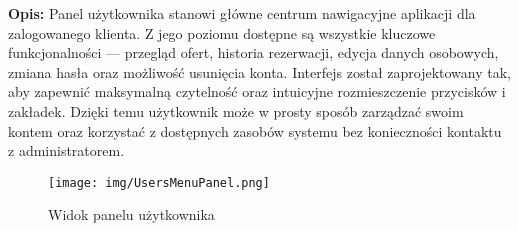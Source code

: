 \noindent
{\small \textbf{Opis:} Panel użytkownika stanowi główne centrum nawigacyjne aplikacji dla zalogowanego klienta. Z jego poziomu dostępne są wszystkie kluczowe funkcjonalności — przegląd ofert, historia rezerwacji, edycja danych osobowych, zmiana hasła oraz możliwość usunięcia konta. Interfejs został zaprojektowany tak, aby zapewnić maksymalną czytelność oraz intuicyjne rozmieszczenie przycisków i zakładek. Dzięki temu użytkownik może w prosty sposób zarządzać swoim kontem oraz korzystać z dostępnych zasobów systemu bez konieczności kontaktu z administratorem.}
    \begin{figure}[H]
    \centering
    \texttt{[image: img/UsersMenuPanel.png]}
    \caption{Widok panelu użytkownika}
    \label{fig:delete_account_gui}
\end{figure}

